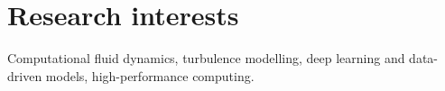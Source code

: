 \documentclass[line]{res}
\newenvironment{p}
  {\begin{adjustwidth}{-10pt}{0pt}}
  {\end{adjustwidth}}
\begin{document}


\begin{resume}
\section{}
\vspace{-15pt} 
\hfill

\noindent

\section{Research interests}
\begin{p}
Computational fluid dynamics, turbulence modelling, deep learning and data-driven models, high-performance computing. 
\end{p}
 

\end{resume}
\end{document}
